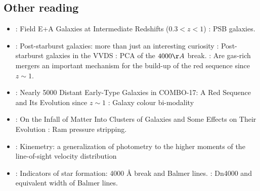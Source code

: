 \subsection{Other reading}
\begin{itemize}
\item \citet{2004ApJ...609..683T} : {Field E+A Galaxies at Intermediate Redshifts ($0.3 < z < 1$)} : PSB galaxies.
\item \citet{2009MNRAS.395..144W} : {Post-starburst galaxies: more than just an interesting curiosity} : {Post-starburst galaxies in the VVDS : PCA of the $4000\AA$ break.} : Are gas-rich mergers an important mechanism for the build-up of the red sequence since $z\sim1$.
\item \citet{2004ApJ...608..752B} : {Nearly 5000 Distant Early-Type Galaxies in COMBO-17: A Red Sequence and Its Evolution since $z\sim1$} : Galaxy colour bi-modality
\item \citet{1972ApJ...176....1G} : {On the Infall of Matter Into Clusters of Galaxies and Some Effects on Their Evolution} : Ram pressure stripping.
\item \citet{2006MNRAS.366..787K} : {Kinemetry: a generalization of photometry to the higher moments of the line-of-sight velocity distribution}
\item \citet{1997A&A...325.1025P} : {Indicators of star formation: 4000 {\r{A}} break and Balmer lines.} : Dn4000 and equivalent width of Balmer lines.
\end{itemize}